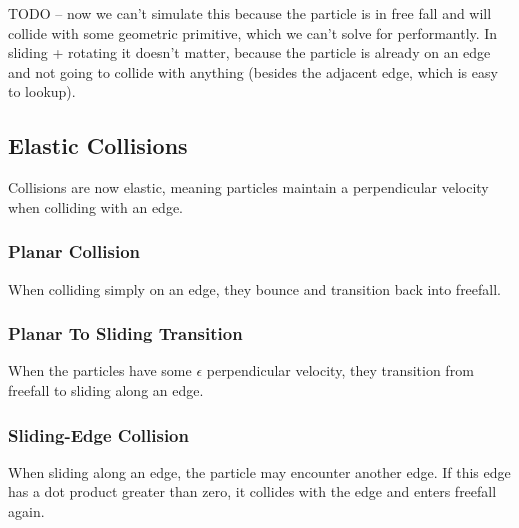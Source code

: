 


TODO -- now we can't simulate this because the particle is in free fall and will collide with some geometric primitive, which we can't solve for performantly. In sliding + rotating it doesn't matter, because the particle is already on an edge and not going to collide with anything (besides the adjacent edge, which is easy to lookup).

	\subsection{Elastic Collisions}

	Collisions are now elastic, meaning particles maintain a perpendicular velocity when colliding with an edge.

		\subsubsection{Planar Collision}

		When colliding simply on an edge, they bounce and transition back into freefall.


		\subsubsection{Planar To Sliding Transition}

		When the particles have some $\epsilon$ perpendicular velocity, they transition from freefall to sliding along an edge.


		\subsubsection{Sliding-Edge Collision}

		When sliding along an edge, the particle may encounter another edge. If this edge has a dot product greater than zero, it collides with the edge and enters freefall again.


